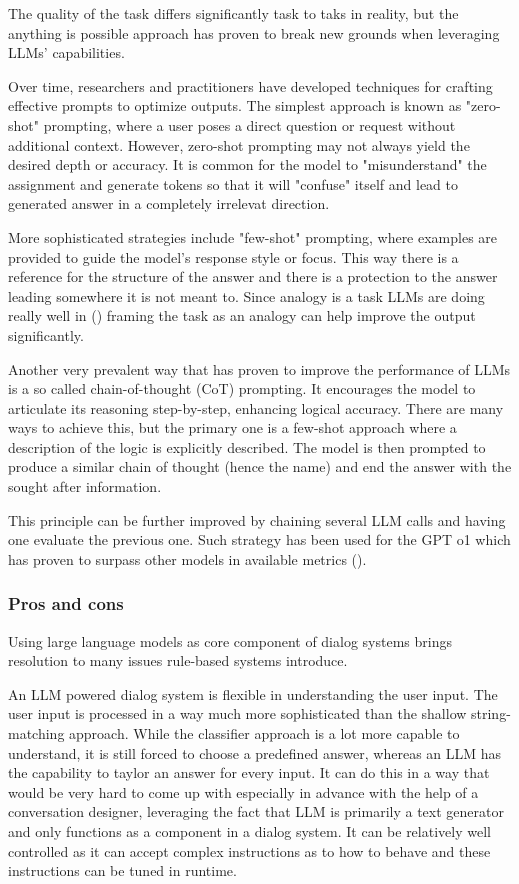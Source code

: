 \documentclass[12pt]{report}
\begin{document}
{The quality of the task differs significantly task to taks in reality,
but the anything is possible approach has proven to break new grounds
when leveraging LLMs' capabilities.

Over time, researchers and practitioners have developed techniques for
crafting effective prompts to optimize outputs.
The simplest approach is known as "zero-shot" prompting,
where a user poses a direct question or request without additional context.
However, zero-shot prompting may not always yield the desired depth or accuracy.
It is common for the model to "misunderstand" the assignment
and generate tokens so that it will "confuse" itself
and lead to generated answer in a completely irrelevat direction.

More sophisticated strategies include "few-shot" prompting,
where examples are provided to guide the model's response style or focus.
This way there is a reference for the structure of the answer
and there is a protection to the answer leading somewhere it is not meant to.
Since analogy is a task LLMs are doing really well in ()
framing the task as an analogy can help improve the output significantly.

Another very prevalent way that has proven to
improve the performance of LLMs is a so called
chain-of-thought (CoT) prompting.
It encourages the model to
articulate its reasoning step-by-step,
enhancing logical accuracy.
There are many ways to achieve this,
but the primary one is a few-shot approach
where a description of the logic is
explicitly described.
The model is then prompted to produce
a similar chain of thought (hence the name)
and end the answer with the sought after information.

This principle can be further improved by
chaining several LLM calls and having one
evaluate the previous one.
Such strategy has been used for the GPT o1
which has proven to surpass other models
in available metrics ().

\subsubsection{Pros and cons}

Using large language models as core component
of dialog systems brings resolution to many issues
rule-based systems introduce.

An LLM powered dialog system is flexible in understanding
the user input.
The user input is processed in a way much more sophisticated
than the shallow string-matching approach.
While the classifier approach is a lot more capable to understand,
it is still forced to choose a predefined answer, whereas
an LLM has the capability to taylor an answer for every input.
It can do this in a way that would be very hard to come up with
especially in advance with the help of a conversation designer,
leveraging the fact that LLM is primarily a text generator
and only functions as a component in a dialog system.
It can be relatively well controlled as
it can accept complex instructions as to how to behave
and these instructions can be tuned in runtime.

}
\end{document}
